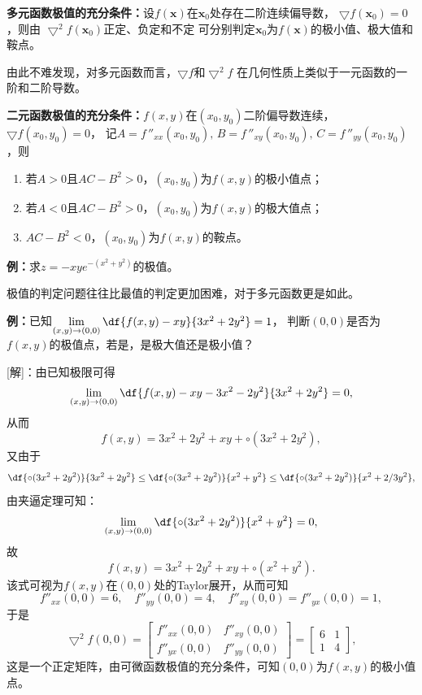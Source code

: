 \begin{thx}
	{\bf 多元函数极值的充分条件：}设$f(\bm{x})$在$\bm{x}_0$处存在二阶连续偏导数，
	$\bigtriangledown f(\bm{x}_0)=0$，则由
	$\bigtriangledown^2 f(\bm{x}_0)$正定、负定和不定
	可分别判定$\bm{x}_0$为$f(\bm{x})$的极小值、极大值和鞍点。
\end{thx}
由此不难发现，对多元函数而言，$\bigtriangledown f$和$\bigtriangledown^2 f$
在几何性质上类似于一元函数的一阶和二阶导数。
\begin{thx}
	{\bf 二元函数极值的充分条件：}$f(x,y)$在$(x_0,y_0)$二阶偏导数连续，$\bigtriangledown f(x_0,y_0)=0$，
	记$A=f\,''_{xx}(x_0,y_0),\,B=f\,''_{xy}(x_0,y_0),\,C=f\,''_{yy}(x_0,y_0)$，则
	\begin{enumerate}%
	  \item 若$A>0$且$AC-B^2>0$，$(x_0,y_0)$为$f(x,y)$的极小值点；
	  \item 若$A<0$且$AC-B^2>0$，$(x_0,y_0)$为$f(x,y)$的极大值点；
	  \item $AC-B^2<0$，$(x_0,y_0)$为$f(x,y)$的鞍点。
	\end{enumerate}
\end{thx}

{\bf 例：}求$z=-xye^{-(x^2+y^2)}$的极值。

极值的判定问题往往比最值的判定更加困难，对于多元函数更是如此。

{\bf 例：}已知$\lim\limits_{(x,y)\to(0,0)}\df{f(x,y)-xy}{3x^2+2y^2}=1$，
判断$(0,0)$是否为$f(x,y)$的极值点，若是，是极大值还是极小值？

[解]：由已知极限可得
$$\lim\limits_{(x,y)\to(0,0)}\df{f(x,y)-xy-3x^2-2y^2}{3x^2+2y^2}=0,$$
从而
$$f(x,y)=3x^2+2y^2+xy+\circ(3x^2+2y^2),$$
又由于
$$\df{\circ(3x^2+2y^2)}{3x^2+2y^2}\leq\df{\circ(3x^2+2y^2)}{x^2+y^2}
\leq\df{\circ(3x^2+2y^2)}{x^2+2/3y^2},$$
由夹逼定理可知：
$$\lim\limits_{(x,y)\to(0,0)}\df{\circ(3x^2+2y^2)}{x^2+y^2}=0,$$
故
$$f(x,y)=3x^2+2y^2+xy+\circ(x^2+y^2).$$
该式可视为$f(x,y)$在$(0,0)$处的Taylor展开，从而可知
$$f''_{xx}(0,0)=6,\quad f''_{yy}(0,0)=4,
\quad f''_{xy}(0,0)=f''_{yx}(0,0)=1,$$
于是
$$\bigtriangledown^2f(0,0)=\left[\begin{array}{cc}
f''_{xx}(0,0) & f''_{xy}(0,0) \\ f''_{yx}(0,0) & f''_{yy}(0,0)
\end{array}\right]
=\left[\begin{array}{cc}
6 & 1 \\ 1 & 4
\end{array}\right],$$
这是一个正定矩阵，由可微函数极值的充分条件，可知$(0,0)$为$f(x,y)$的极小值点。
\fin

